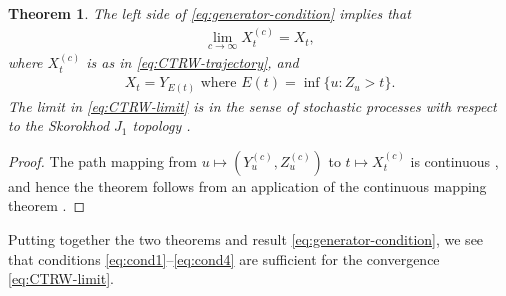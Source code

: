 \documentclass[a4paper,12pt]{elsarticle}
\numberwithin{equation}{section}
\theoremstyle{plain}
\newtheorem{theorem}{Theorem}[section]
\theoremstyle{definition}
\theoremstyle{remark}
\numberwithin{equation}{section}
\newcommand{\1}{\mathbf 1}
\begin{document}
\begin{theorem}
The left side of \eqref{eq:generator-condition} implies that 
\begin{align} \label{eq:CTRW-limit}
\lim_{c \to \infty} X^{(c)}_t = X_t,
\end{align}
where $X^{(c)}_t$ is as in \eqref{eq:CTRW-trajectory}, and
\begin{align} \label{eq:subordination}
X_t = Y_{E(t)} \text{ where } E(t) = \inf\{u: Z_u > t\}.
\end{align}
The limit in \eqref{eq:CTRW-limit} is in the sense of stochastic processes with respect to the Skorokhod $J_1$ topology \cite{Whitt2010}. 
\end{theorem}
\begin{proof}
The path mapping from $u \mapsto (Y^{(c)}_u, Z^{(c)}_u)$ to $t \mapsto X^{(c)}_t$
is continuous \cite{StrakaHenry}, and hence the theorem follows from an application of the continuous mapping theorem \cite{Billingsley1968, StrakaHenry}. 
\end{proof}

Putting together the two theorems and result \eqref{eq:generator-condition}, 
we see that conditions \eqref{eq:cond1}--\eqref{eq:cond4} are sufficient for the 
convergence \eqref{eq:CTRW-limit}.
\end{document}
